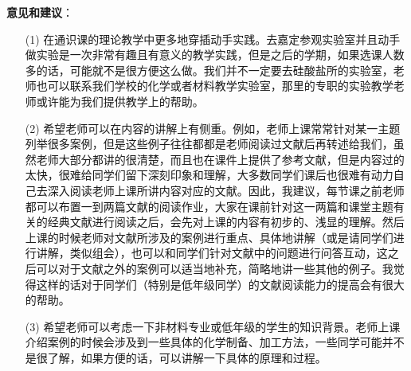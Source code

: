 \documentclass{assignment}
\begin{document}
\begin{da}
    \noindent\textbf{意见和建议}：
    \begin{itemize}
        \item[(1)] 在通识课的理论教学中更多地穿插动手实践。去嘉定参观实验室并且动手做实验是一次非常有趣且有意义的教学实践，但是之后的学期，如果选课人数多的话，可能就不是很方便这么做。我们并不一定要去硅酸盐所的实验室，老师也可以联系我们学校的化学或者材料教学实验室，那里的专职的实验教学老师或许能为我们提供教学上的帮助。
        \item[(2)] 希望老师可以在内容的讲解上有侧重。例如，老师上课常常针对某一主题列举很多案例，但是这些例子往往都都是老师阅读过文献后再转述给我们，虽然老师大部分都讲的很清楚，而且也在课件上提供了参考文献，但是内容过的太快，很难给同学们留下深刻印象和理解，大多数同学们课后也很难有动力自己去深入阅读老师上课所讲内容对应的文献。因此，我建议，每节课之前老师都可以布置一到两篇文献的阅读作业，大家在课前针对这一两篇和课堂主题有关的经典文献进行阅读之后，会先对上课的内容有初步的、浅显的理解。然后上课的时候老师对文献所涉及的案例进行重点、具体地讲解（或是请同学们进行讲解，类似组会），也可以和同学们针对文献中的问题进行问答互动，这之后可以对于文献之外的案例可以适当地补充，简略地讲一些其他的例子。我觉得这样的话对于同学们（特别是低年级同学）的文献阅读能力的提高会有很大的帮助。
        \item[(3)] 希望老师可以考虑一下非材料专业或低年级的学生的知识背景。老师上课介绍案例的时候会涉及到一些具体的化学制备、加工方法，一些同学可能并不是很了解，如果方便的话，可以讲解一下具体的原理和过程。
    \end{itemize}
\end{da}



\end{document}
